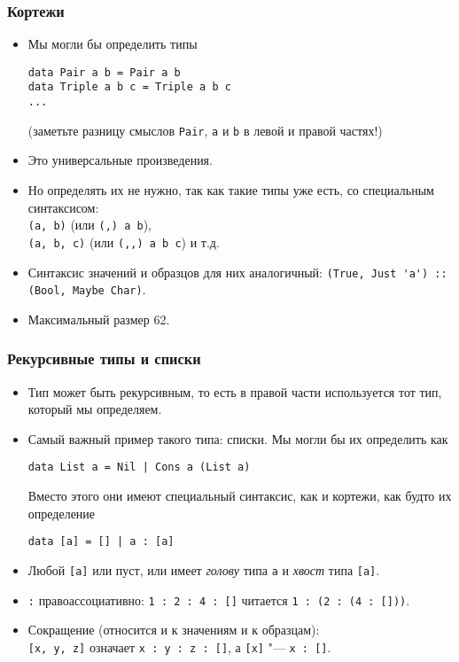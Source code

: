 \documentclass[10pt]{beamer}
\begin{document}
\begin{frame}[fragile]
\frametitle{Кортежи}
\begin{itemize}
    \item Мы могли бы определить типы 
\begin{lstlisting}
data Pair a b = Pair a b
data Triple a b c = Triple a b c
...
\end{lstlisting}
(заметьте разницу смыслов \lstinline|Pair|, \lstinline|a| и \lstinline|b| в левой и правой частях!)
    \item Это универсальные произведения.
    \pause
    \item Но определять их не нужно, так как такие типы уже есть, со специальным синтаксисом:\\
    \lstinline|(a, b)| (или \lstinline|(,) a b|),\\ \lstinline|(a, b, c)| (или \lstinline|(,,) a b c|) и т.д.
    \item Синтаксис значений и образцов для них аналогичный: 
    \lstinline|(True, Just 'a') :: |\pause\lstinline|(Bool, Maybe Char)|.
    \item Максимальный размер 62.
    \end{itemize}
\end{frame}

\begin{frame}[fragile]
\frametitle{Рекурсивные типы и списки}
\begin{itemize}
    \item Тип может быть рекурсивным, то есть в правой части используется тот тип, который мы определяем.
    \item Самый важный пример такого типа: списки.
    Мы могли бы их определить как 
\begin{lstlisting}
data List a = Nil | Cons a (List a)
\end{lstlisting}
Вместо этого они имеют специальный синтаксис, как и кортежи, как будто их определение
\begin{lstlisting}
data [a] = [] | a : [a]
\end{lstlisting}
    \item Любой \lstinline|[a]| или пуст, или имеет \emph{голову} типа \lstinline|a| и \emph{хвост} типа \lstinline|[a]|.
    \item \lstinline|:| правоассоциативно: \lstinline|1 : 2 : 4 : []| читается \lstinline|1 : (2 : (4 : []))|.
    \item Сокращение (относится и к значениям и к образцам):\\
    \lstinline|[x, y, z]| означает \lstinline|x : y : z : []|, а \lstinline|[x]| "--- \lstinline|x : []|.
\end{itemize}
\end{frame}
\end{document}
